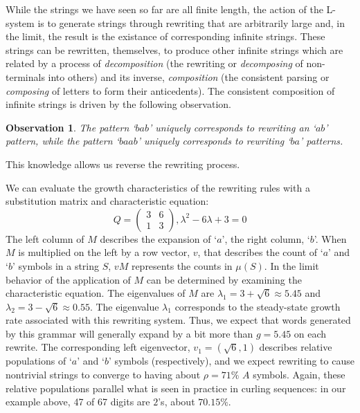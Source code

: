 \documentclass[11pt]{article}
\def\emph#1{{\em #1\/}}
\def\term#1{\emph{#1}}
\newcounter{thm}
\newtheorem{observation}[thm]{Observation}
\def\ni{\noindent}
\def\q#1{`$#1$'}
\begin{document}
While the strings we have seen so far are all finite length, the action of the
L-system is to generate strings through rewriting that are arbitrarily large
and, in the limit, the result is the existance of corresponding infinite
strings.  These strings can be rewritten, themselves, to produce other
infinite strings which are related by a process of \term{decomposition} (the
rewriting or \term{decomposing} of non-terminals into others) and its inverse,
\term{composition} (the consistent parsing or \term{composing} of letters to
form their anticedents).  The consistent composition of infinite strings is driven by the following observation.
\begin{observation}
The pattern \q{bab} uniquely corresponds to rewriting an \q{ab} pattern,
while the pattern \q{baab} uniquely corresponds to rewriting \q{ba} patterns.
\end{observation}
\ni This knowledge allows us reverse the rewriting process.

We can evaluate the growth characteristics of the rewriting rules with a
substitution matrix and characteristic equation\cite{Se95}:
$$Q=\left( \begin{array}{cc} 3 & 6 \\ 1 & 3 \end{array} \right),
\lambda^2-6\lambda +3=0$$ \ni The left column of $M$ describes the expansion
of \q{a}, the right column, \q{b}.  When $M$ is multiplied on the left by
a row vector, $v$, that describes the count of \q{a} and \q{b} symbols in a string $S$, $vM$ represents the counts in $\mu(S)$.  In the limit behavior of the application of $M$ can be determined by examining the characteristic equation.  The eigenvalues of $M$ are
$\lambda_1=3+\sqrt{6}\approx 5.45$ and $\lambda_2=3-\sqrt{6}\approx 0.55$.
The eigenvalue $\lambda_1$ corresponds to the steady-state growth rate
associated with this rewriting system.  Thus, we expect that words generated
by this grammar will generally expand by a bit more than $g=5.45$ on each
rewrite.  The corresponding left eigenvector, $v_1=(\sqrt{6},1)$ describes relative
populations of \q{a} and \q{b} symbols (respectively), and we expect rewriting to
cause nontrivial strings to converge to having about $\rho=71\%$ $A$ symbols.
Again, these relative populations parallel what is seen in practice in curling
sequences: in our example above, 47 of 67 digits are $2$'s, about $70.15\%$.
\end{document}
